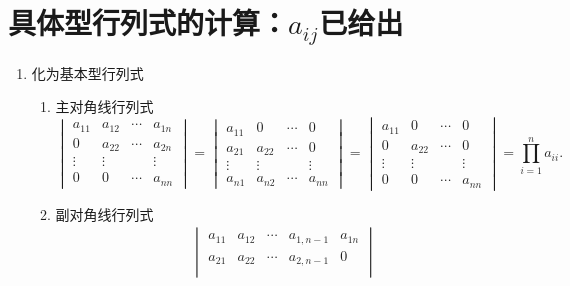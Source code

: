 
\section{具体型行列式的计算：$a_{ij}$已给出}
\begin{enumerate}
    \item 化为基本型行列式
          \DTwoThree
          \begin{enumerate}
              \item 主对角线行列式
                    $$\begin{vmatrix}
                            a_{11} & a_{12} & \cdots & a_{1n} \\
                            0      & a_{22} & \cdots & a_{2n} \\
                            \vdots & \vdots &        & \vdots \\
                            0      & 0      & \cdots & a_{nn}
                        \end{vmatrix}=
                        \begin{vmatrix}
                            a_{11} & 0      & \cdots & 0      \\
                            a_{21} & a_{22} & \cdots & 0      \\
                            \vdots & \vdots &        & \vdots \\
                            a_{n1} & a_{n2} & \cdots & a_{nn}
                        \end{vmatrix}=
                        \begin{vmatrix}
                            a_{11} & 0      & \cdots & 0      \\
                            0      & a_{22} & \cdots & 0      \\
                            \vdots & \vdots &        & \vdots \\
                            0      & 0      & \cdots & a_{nn}
                        \end{vmatrix}=\prod_{i=1}^na_{ii}.$$
              \item 副对角线行列式
                    $$\begin{aligned}
                            \begin{vmatrix}
                                a_{11} & a_{12} & \cdots & a_{1,n-1} & a_{1n} \\
                                a_{21} & a_{22} & \cdots & a_{2,n-1} & 0      \\

\end{vmatrix}
\end{aligned}$$
\end{enumerate}
\end{enumerate}
